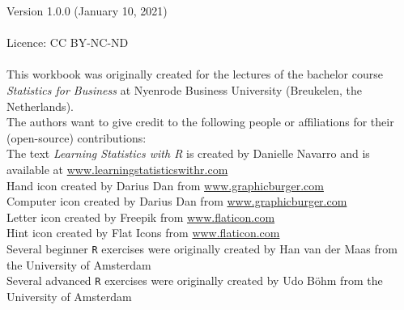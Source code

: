 \thispagestyle{emptyhead}

\vspace*{\fill} 

{\fontsize{8}{10}\selectfont

Version 1.0.0 (January 10, 2021) \\
\\
Licence: CC BY-NC-ND \\
\\
This workbook was originally created for the lectures of the bachelor course \textit{Statistics for Business} at Nyenrode Business University (Breukelen, the Netherlands). \\

The authors want to give credit to the following people or affiliations for their (open-source) contributions: \\

The text \textit{Learning Statistics with R} is created by Danielle Navarro and is available at \url{www.learningstatisticswithr.com} \\
Hand icon created by Darius Dan from \url{www.graphicburger.com} \\
Computer icon created by Darius Dan from \url{www.graphicburger.com} \\
Letter icon created by Freepik from \url{www.flaticon.com} \\
Hint icon created by Flat Icons from \url{www.flaticon.com} \\
Several beginner \texttt{R} exercises were originally created by Han van der Maas from the University of Amsterdam \\
Several advanced \texttt{R} exercises were originally created by Udo B{\"o}hm from the University of Amsterdam

}

\clearpage %
